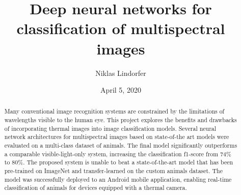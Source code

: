 \documentclass{l4proj}
\begin{document}
\title{Deep neural networks for classification of multispectral images}
\author{Niklas Lindorfer}
\date{April 5, 2020}

\maketitle

\begin{abstract}
    Many conventional image recognition systems are constrained by the limitations of wavelengths visible to the human eye.
    This project explores the benefits and drawbacks of incorporating thermal images into image classification models. Several neural network architectures for multispectral images based on state-of-the art models were evaluated on a multi-class dataset of animals.
    The final model significantly outperforms a comparable visible-light-only system, increasing the classification f1-score from $74\%$ to $80\%$. The proposed system is unable to beat a state-of-the-art model that has been pre-trained on ImageNet and transfer-learned on the custom animals dataset.
    The model was successfully deployed to an Android mobile application, enabling real-time classification of animals for devices equipped with a thermal camera.
\end{abstract}


%
%
\def\consentname {Niklas Lindorfer} %
\def\consentdate {26 September 2019} %
%
\educationalconsent
\end{document}
